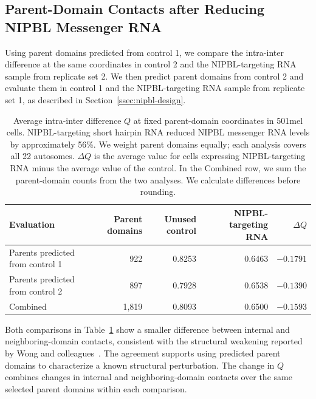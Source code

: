 \begin{samepage}
\subsection{Parent-Domain Contacts after Reducing NIPBL Messenger RNA}
\label{ssec:nipbl-structure}
\label{ssec:biological-results}

Using parent domains predicted from control 1, we compare the intra-inter difference at the same coordinates in control 2 and the NIPBL-targeting RNA sample from replicate set 2.
We then predict parent domains from control 2 and evaluate them in control 1 and the NIPBL-targeting RNA sample from replicate set 1, as described in Section~\ref{ssec:nipbl-design}.
\par
\end{samepage}

\begin{table}[H]
\centering
\caption{Average intra-inter difference $Q$ at fixed parent-domain coordinates in 501mel cells. NIPBL-targeting short hairpin RNA reduced NIPBL messenger RNA levels by approximately 56\%. We weight parent domains equally; each analysis covers all 22 autosomes. $\Delta Q$ is the average value for cells expressing NIPBL-targeting RNA minus the average value of the control. In the Combined row, we sum the parent-domain counts from the two analyses. We calculate differences before rounding.}
\label{tab:nipbl-contact-quality}
\small
\begin{tabularx}{\linewidth}{@{}Xrrrr@{}}
\toprule
Evaluation & Parent domains & Unused control & NIPBL-targeting RNA & $\Delta Q$\\
\midrule
Parents predicted from control 1 & 922 & 0.8253 & 0.6463 & $-0.1791$\\
Parents predicted from control 2 & 897 & 0.7928 & 0.6538 & $-0.1390$\\
Combined & 1,819 & 0.8093 & 0.6500 & $-0.1593$\\
\bottomrule
\end{tabularx}
\end{table}

Both comparisons in Table~\ref{tab:nipbl-contact-quality} show a smaller difference between internal and neighboring-domain contacts, consistent with the structural weakening reported by Wong and colleagues~\cite{wong2025hierarchy}.
The agreement supports using predicted parent domains to characterize a known structural perturbation.
The change in $Q$ combines changes in internal and neighboring-domain contacts over the same selected parent domains within each comparison.
